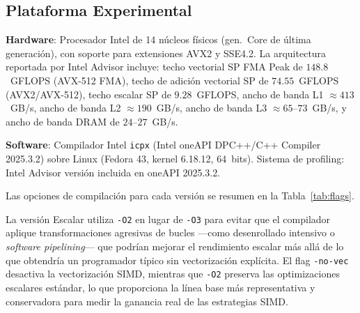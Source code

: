 \subsection{Plataforma Experimental}

\textbf{Hardware}: Procesador Intel de 14 n\'ucleos f\'isicos
(gen.~Core de \'ultima generaci\'on), con soporte para extensiones
AVX2 y SSE4.2.
La arquitectura reportada por Intel Advisor incluye:
techo vectorial SP FMA Peak de $148.8$~GFLOPS (AVX-512 FMA),
techo de adici\'on vectorial SP de $74.55$~GFLOPS (AVX2/AVX-512),
techo escalar SP de $9.28$~GFLOPS,
ancho de banda L1 $\approx 413$~GB/s,
ancho de banda L2 $\approx 190$~GB/s,
ancho de banda L3 $\approx 65$--$73$~GB/s,
y ancho de banda DRAM de $24$--$27$~GB/s.

\textbf{Software}: Compilador Intel \texttt{icpx} (Intel oneAPI
DPC++/C++ Compiler 2025.3.2) sobre Linux (Fedora 43, kernel
6.18.12, 64~bits).
Sistema de profiling: Intel Advisor versi\'on incluida en oneAPI
2025.3.2.

Las opciones de compilaci\'on para cada versi\'on se resumen en
la Tabla~\ref{tab:flags}.

\begin{table}[h]
\centering
\caption{Opciones de compilaci\'on por versi\'on.}
\label{tab:flags}
\end{table}

La versi\'on Escalar utiliza \texttt{-O2} en lugar de \texttt{-O3}
para evitar que el compilador aplique transformaciones agresivas
de bucles ---como desenrollado intensivo o \textit{software pipelining}---
que podr\'ian mejorar el rendimiento escalar m\'as all\'a de lo
que obtendr\'ia un programador t\'ipico sin vectorizaci\'on expl\'icita.
El flag \texttt{-no-vec} desactiva la vectorizaci\'on SIMD,
mientras que \texttt{-O2} preserva las optimizaciones escalares
est\'andar, lo que proporciona la l\'inea base m\'as representativa
y conservadora para medir la ganancia real de las estrategias SIMD.

